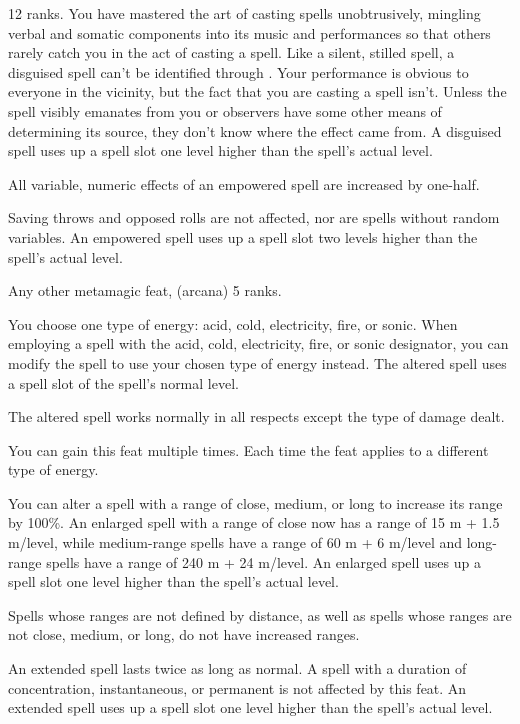 
{ 12 ranks.}
{You have mastered the art of casting spells unobtrusively, mingling verbal and somatic components into its music and performances so that others rarely catch you in the act of casting a spell. Like a silent, stilled spell, a disguised spell can't be identified through . Your performance is obvious to everyone in the vicinity, but the fact that you are casting a spell isn't. Unless the spell visibly emanates from you or observers have some other means of determining its source, they don't know where the effect came from. A disguised spell uses up a spell slot one level higher than the spell's actual level.}

{All variable, numeric effects of an empowered spell are increased by one-half.

Saving throws and opposed rolls are not affected, nor are spells without random variables. An empowered spell uses up a spell slot two levels higher than the spell's actual level.}

{}
{Any other metamagic feat,  (arcana) 5 ranks.}
{You choose one type of energy: acid, cold, electricity, fire, or sonic. When employing a spell with the acid, cold, electricity, fire, or sonic designator, you can modify the spell to use your chosen type of energy instead. The altered spell uses a spell slot of the spell's normal level.

The altered spell works normally in all respects except the type of damage dealt.}
{}{You can gain this feat multiple times. Each time the feat applies to a different type of energy.}

{You can alter a spell with a range of close, medium, or long to increase its range by 100\%. An enlarged spell with a range of close now has a range of 15 m + 1.5 m/level, while medium-range spells have a range of 60 m + 6 m/level and long-range spells have a range of 240 m + 24 m/level. An enlarged spell uses up a spell slot one level higher than the spell's actual level.

Spells whose ranges are not defined by distance, as well as spells whose ranges are not close, medium, or long, do not have increased ranges.}

{An extended spell lasts twice as long as normal. A spell with a duration of concentration, instantaneous, or permanent is not affected by this feat. An extended spell uses up a spell slot one level higher than the spell's actual level.}

